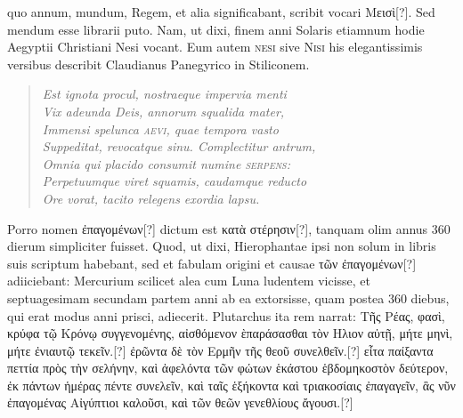  quo annum, mundum,
Regem, et alia significabant, scribit vocari \textgreek{Μεισὶ}[?].
Sed mendum
esse librarii puto.
Nam, ut dixi, finem anni Solaris etiamnum
hodie Aegyptii Christiani Nesi vocant.
Eum autem \textsc{nesi} sive \textsc{Nisi}
his elegantissimis versibus describit Claudianus Panegyrico
  in
Stiliconem.
\begin{verse}
\textit{Est ignota procul, nostraeque impervia menti\\
  Vix adeunda Deis, annorum squalida mater,\\
  Immensi spelunca \textsc{aevi}, quae tempora vasto\\
  Suppeditat, revocatque sinu. Complectitur antrum,\\
  Omnia qui placido consumit numine \textsc{serpens}:\\
  Perpetuumque viret squamis, caudamque reducto\\
  Ore vorat, tacito relegens exordia lapsu.
}
\end{verse}
%
Porro nomen \textgreek{ἐπαγομένων}[?] dictum est
 \textgreek{κατὰ στέρησιν}[?], tanquam olim annus
360 dierum simpliciter fuisset.
Quod, ut dixi, Hierophantae
ipsi non solum in libris suis scriptum habebant, sed et fabulam origini
et causae \textgreek{τῶν ἐπαγομένων}[?] adiiciebant: Mercurium scilicet alea
cum Luna ludentem vicisse, et septuagesimam secundam partem
anni ab ea extorsisse, quam postea 360 diebus, qui erat modus anni
prisci, adiecerit.
Plutarchus ita rem narrat: \textgreek{Τῆς Ρέας, φασὶ, κρύφα
τῷ Κρόνῳ συγγενομένης, αἰσθόμενον ὲπαράσασθαι τὸν Ηλιον αὐτῇ, μήτε μηνὶ,
μήτε ἐνιαυτῷ τεκεῖν.}[?]
\textgreek{ἐρῶντα δὲ τὸν Ερμῆν τῆς θεοῦ συνελθεῖν.}[?]
\textgreek{εἶτα παίξαντα
πεττία πρὸς τὴν σελήνην, καὶ ἀφελόντα τῶν φώτων ἑκάστου ἑβδομηκοστὸν δεύτερον,
ἐκ πάντων ἡμέρας πέντε συνελεῖν, καὶ ταῖς ἑξήκοντα καὶ τριακοσίαις
ἐπαγαγεῖν, ἃς νῦν ἐπαγομένας
Αἰγύπτιοι καλοῦσι, καὶ τῶν θεῶν γενεθλίους
ἄγουσι.}[?]
